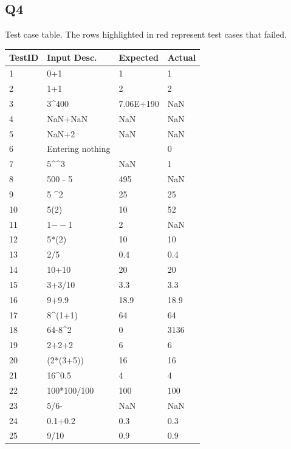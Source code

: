 \documentclass[12pt, letterpaper, titlepage]{article}
\begin{document}
\subsection*{Q4}
Test case table. The rows highlighted in red represent test cases that failed.
\begin{tabularx}{\textwidth}{|X|X|X|X|}
    \hline
    \textbf{TestID} & \textbf{Input Desc.} & \textbf{Expected} & \textbf{Actual} \\
    \hline
    1 & 0+1 & 1 & 1 \\
    \hline
    2 & 1+1 & 2 & 2 \\
    \hline
    \rowcolor[HTML]{F4CCCC} 
    3 & 3\textasciicircum{}400 & 7.06E+190 & NaN \\
    \hline
    4 & NaN+NaN & NaN & NaN \\
    \hline
    5 & NaN+2 & NaN & NaN \\
    \hline
    6 & Entering nothing &  & 0 \\
    \hline
    \rowcolor[HTML]{F4CCCC} 
    7 & 5\textasciicircum{}\textasciicircum{}3 & NaN & 1 \\
    \hline
    \rowcolor[HTML]{F4CCCC} 
    8 & 500 - 5 & 495 & NaN \\
    \hline
    9 & 5 \textasciicircum 2 & 25 & 25 \\
    \hline
    \rowcolor[HTML]{F4CCCC} 
    10 & 5(2) & 10 & 52 \\
    \hline
    \rowcolor[HTML]{F4CCCC} 
    11 & 1$--$1 & 2 & NaN \\
    \hline
    12 & 5*(2) & 10 & 10 \\
    \hline
    13 & 2/5 & 0.4 & 0.4 \\
    \hline
    14 & 10+10 & 20 & 20 \\
    \hline
    15 & 3+3/10 & 3.3 & 3.3 \\
    \hline
    16 & 9+9.9 & 18.9 & 18.9 \\
    \hline
    17 & 8\textasciicircum{}(1+1) & 64 & 64 \\
    \hline
    \rowcolor[HTML]{F4CCCC} 
    18 & 64-8\textasciicircum{}2 & 0 & 3136 \\
    \hline
    19 & 2+2+2 & 6 & 6 \\
    \hline
    20 & (2*(3+5)) & 16 & 16 \\
    \hline
    21 & 16\textasciicircum{}0.5 & 4 & 4 \\
    \hline
    22 & 100*100/100 & 100 & 100 \\
    \hline
    23 & 5/6- & NaN & NaN \\
    \hline
    24 & 0.1+0.2 & 0.3 & 0.3 \\
    \hline
    25 & 9/10 & 0.9 & 0.9 \\
    \hline
 \end{tabularx}
\end{document}
